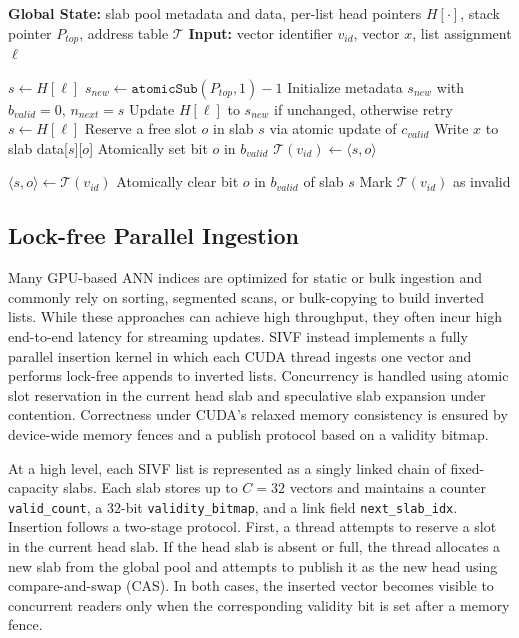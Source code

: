 \documentclass[sigconf,anonymous]{acmart}
\theoremstyle{plain}
\theoremstyle{definition}
\theoremstyle{remark}
\begin{document}
\begin{algorithm}[t]
\caption{Core Operations of SDMA}
\label{alg:sdma_core}
\begin{algorithmic}[1]
\State \textbf{Global State:} slab pool metadata and data, per-list head pointers $H[\cdot]$, stack pointer $P_{top}$, address table $\mathcal{T}$
\State \textbf{Input:} vector identifier $v_{id}$, vector $x$, list assignment $\ell$

    \State $s \gets H[\ell]$
        \State $s_{new} \gets \texttt{atomicSub}(P_{top}, 1) - 1$
        \State Initialize metadata $s_{new}$ with $b_{valid}=0$, $n_{next}=s$
        \State Update $H[\ell]$ to $s_{new}$ if unchanged, otherwise retry
        \State $s \gets H[\ell]$
    \EndWhile
    \State Reserve a free slot $o$ in slab $s$ via atomic update of $c_{valid}$
    \State Write $x$ to slab data[$s$][$o$]
    \State Atomically set bit $o$ in $b_{valid}$
    \State $\mathcal{T}(v_{id}) \gets \langle s, o \rangle$
\EndProcedure

    \State $\langle s, o \rangle \gets \mathcal{T}(v_{id})$
        \State Atomically clear bit $o$ in $b_{valid}$ of slab $s$
        \State Mark $\mathcal{T}(v_{id})$ as invalid
    \EndIf
\EndProcedure
\end{algorithmic}
\end{algorithm}

\subsection{Lock-free Parallel Ingestion}
\label{sec:lock_free_ingestion}

Many GPU-based ANN indices are optimized for static or bulk ingestion and commonly rely on sorting, segmented scans, or bulk-copying to build inverted lists. While these approaches can achieve high throughput, they often incur high end-to-end latency for streaming updates. SIVF instead implements a fully parallel insertion kernel in which each CUDA thread ingests one vector and performs lock-free appends to inverted lists. Concurrency is handled using atomic slot reservation in the current head slab and speculative slab expansion under contention. Correctness under CUDA's relaxed memory consistency is ensured by device-wide memory fences and a publish protocol based on a validity bitmap.

At a high level, each SIVF list is represented as a singly linked chain of fixed-capacity slabs. Each slab stores up to $C=32$ vectors and maintains a counter \texttt{valid\_count}, a 32-bit \texttt{validity\_bitmap}, and a link field \texttt{next\_slab\_idx}. Insertion follows a two-stage protocol. First, a thread attempts to reserve a slot in the current head slab. If the head slab is absent or full, the thread allocates a new slab from the global pool and attempts to publish it as the new head using compare-and-swap (CAS). In both cases, the inserted vector becomes visible to concurrent readers only when the corresponding validity bit is set after a memory fence.
\end{document}
